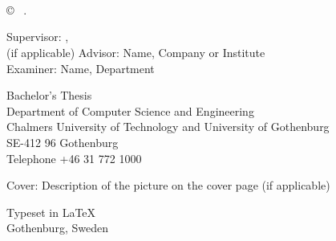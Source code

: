 \newpage
\thispagestyle{plain}
\vspace*{4.5cm}
\oneLineTitle\\
\oneLineSubtitle\\
\MARTINT{} \setlength{\parskip}{1cm}
\FELIXT{} \setlength{\parskip}{1cm}
\HANNEST{} \setlength{\parskip}{1cm}
\\
\MARCUST{} \setlength{\parskip}{1cm}
\JAKOBT{} \setlength{\parskip}{1cm}

\copyright ~ \MEMBERTILDELIST{} \the\year. \setlength{\parskip}{1cm}

Supervisor: \supervisor, \supervisordepartment\\
(if applicable) Advisor: Name, Company or Institute\\
Examiner: Name, Department \setlength{\parskip}{1cm}

Bachelor's Thesis \the\year\\	%
Department of Computer Science and Engineering\\
Chalmers University of Technology and University of Gothenburg\\
SE-412 96 Gothenburg\\
Telephone +46 31 772 1000 \setlength{\parskip}{0.5cm}

\vfill
Cover: Description of the picture on the cover page (if applicable)


Typeset in \LaTeX \\
Gothenburg, Sweden \the\year

